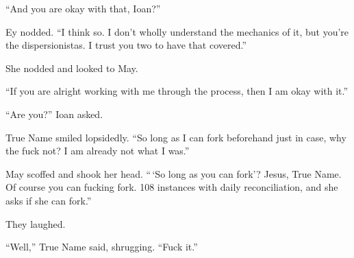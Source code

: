``And you are okay with that, Ioan?''

Ey nodded. ``I think so. I don't wholly understand the mechanics of it, but you're the dispersionistas. I trust you two to have that covered.''

She nodded and looked to May.

``If you are alright working with me through the process, then I am okay with it.''

``Are you?'' Ioan asked.

True Name smiled lopsidedly. ``So long as I can fork beforehand just in case, why the fuck not? I am already not what I was.''

May scoffed and shook her head. ``\,`So long as you can fork'? Jesus, True Name. Of course you can fucking fork. 108 instances with daily reconciliation, and she asks if she can fork.''

They laughed.

``Well,'' True Name said, shrugging. ``Fuck it.''
